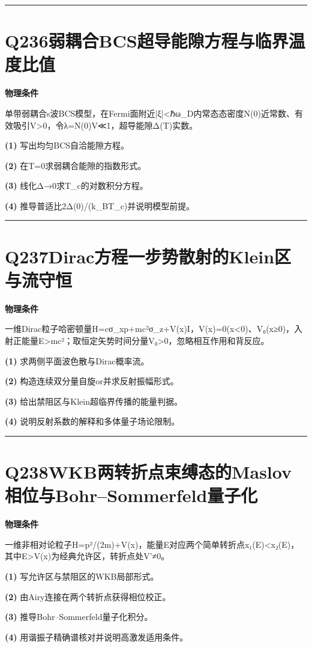\documentclass[UTF8,a4paper,11pt,oneside,openany]{ctexbook}
\begin{document}
\par\bigskip\hrule\bigskip
\section*{Q236\quad 弱耦合BCS超导能隙方程与临界温度比值}
\textbf{物理条件}\par 单带弱耦合s波BCS模型，在Fermi面附近|ξ|<ℏω\_D内常态态密度N(0)近常数、有效吸引V>0，令λ=N(0)V≪1，超导能隙Δ(T)实数。
\par\noindent\textbf{(1)} 写出均匀BCS自洽能隙方程。
\par\noindent\textbf{(2)} 在T=0求弱耦合能隙的指数形式。
\par\noindent\textbf{(3)} 线化Δ→0求T\_c的对数积分方程。
\par\noindent\textbf{(4)} 推导普适比2Δ(0)/(k\_BT\_c)并说明模型前提。

\par\bigskip\hrule\bigskip
\section*{Q237\quad Dirac方程一步势散射的Klein区与流守恒}
\textbf{物理条件}\par 一维Dirac粒子哈密顿量H=cσ\_xp+mc²σ\_z+V(x)I，V(x)=0(x<0)、V₀(x≥0)，入射正能量E>mc²；取恒定矢势时间分量V₀>0，忽略相互作用和背反应。
\par\noindent\textbf{(1)} 求两侧平面波色散与Dirac概率流。
\par\noindent\textbf{(2)} 构造连续双分量自旋or并求反射振幅形式。
\par\noindent\textbf{(3)} 给出禁阻区与Klein超临界传播的能量判据。
\par\noindent\textbf{(4)} 说明反射系数的解释和多体量子场论限制。

\par\bigskip\hrule\bigskip
\section*{Q238\quad WKB两转折点束缚态的Maslov相位与Bohr–Sommerfeld量子化}
\textbf{物理条件}\par 一维非相对论粒子H=p²/(2m)+V(x)，能量E对应两个简单转折点x₁(E)<x₂(E)，其中E>V(x)为经典允许区，转折点处V'≠0。
\par\noindent\textbf{(1)} 写允许区与禁阻区的WKB局部形式。
\par\noindent\textbf{(2)} 由Airy连接在两个转折点获得相位校正。
\par\noindent\textbf{(3)} 推导Bohr–Sommerfeld量子化积分。
\par\noindent\textbf{(4)} 用谐振子精确谱核对并说明高激发适用条件。
\end{document}
